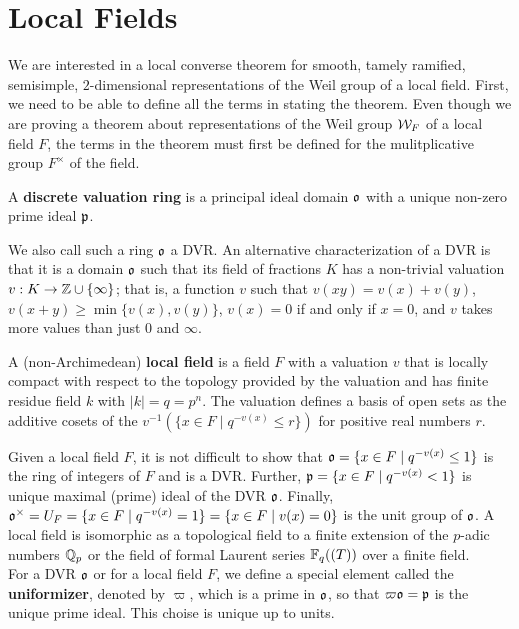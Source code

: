 \section{Local Fields}
\label{sec:local-fields}
We are interested in a local converse theorem for smooth, tamely ramified, semisimple, $2$-dimensional representations of the Weil group of a local field.
First, we need to be able to define all the terms in stating the theorem.
Even though we are proving a theorem about representations of the Weil group $\mathcal{W}_F$ of a local field $F$, the terms in the theorem must first be defined for the mulitplicative group $F^\times$ of the field.
\begin{defn}
  A \textbf{discrete valuation ring} is a principal ideal domain $\mathfrak{o}$ with a unique non-zero prime ideal $\mathfrak{p}$.
\end{defn}
We also call such a ring $\mathfrak{o}$ a DVR.
An alternative characterization of a DVR is that it is a domain $\mathfrak{o}$ such that its field of fractions $K$ has a non-trivial valuation $v : K \to \mathbb{Z} \cup \{ \infty \}$; that is, a function $v$ such that $v(xy) = v(x) + v(y)$, $v(x+y) \geq \min \{v(x),v(y)\}$, $v(x) = 0$ if and only if $x = 0$, and $v$ takes more values than just $0$ and $\infty$.
\begin{defn}
  A (non-Archimedean) \textbf{local field} is a field $F$ with a valuation $v$ that is locally compact with respect to the topology provided by the valuation and has finite residue field $k$ with $|k| = q = p^n$.
  The valuation defines a basis of open sets as the additive cosets of the $v^{-1}(\{x \in F \mid q^{-v(x)} \leq r\})$ for positive real numbers $r$.
\end{defn}
Given a local field $F$, it is not difficult to show that $\mathfrak{o} = \{x \in F \mid q^{-v(x)} \leq 1\}$ is the ring of integers of $F$ and is a DVR.
Further, $\mathfrak{p} = \{x \in F \mid q^{-v(x)} < 1\}$ is unique maximal (prime) ideal of the DVR $\mathfrak{o}$.
Finally, $\mathfrak{o}^\times = U_F = \{x \in F \mid q^{-v(x)} = 1\} = \{x \in F \mid v(x) = 0\}$ is the unit group of $\mathfrak{o}$.
A local field is isomorphic as a topological field to a finite extension of the $p$-adic numbers $\mathbb{Q}_p$ or the field of formal Laurent series $\mathbb{F}_q((T))$ over a finite field.
\\

For a DVR $\mathfrak{o}$ or for a local field $F$, we define a special element called the \textbf{uniformizer}, denoted by $\varpi$, which is a prime in $\mathfrak{o}$, so that $\varpi \mathfrak{o} = \mathfrak{p}$ is the unique prime ideal.
This choise is unique up to units.

